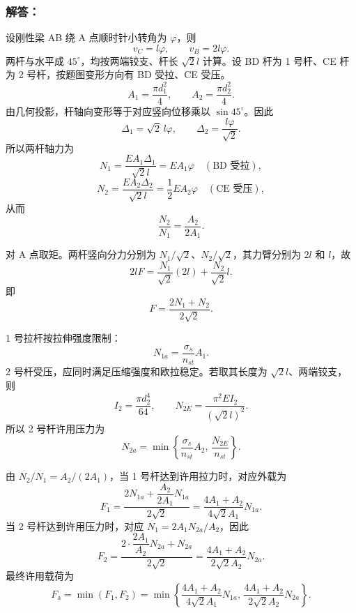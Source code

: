 \documentclass[11pt,a4paper]{ctexrep}
\begin{document}
{\subsubsection*{解答：}
设刚性梁 AB 绕 A 点顺时针小转角为 $\varphi$，则
\[
    v_C=l\varphi,\qquad v_B=2l\varphi.
\]
两杆与水平成 $45^\circ$，均按两端铰支、杆长 $\sqrt2l$ 计算。设 BD 杆为 1 号杆、CE 杆为 2 号杆，按题图变形方向有 BD 受拉、CE 受压。
\[
    A_1=\frac{\pi d_1^2}{4},\qquad A_2=\frac{\pi d_2^2}{4}.
\]
由几何投影，杆轴向变形等于对应竖向位移乘以 $\sin45^\circ$。因此
\[
    \Delta_1=\sqrt2\,l\varphi,\qquad
    \Delta_2=\frac{l\varphi}{\sqrt2}.
\]
所以两杆轴力为
\[
    N_1=\frac{EA_1\Delta_1}{\sqrt2l}=EA_1\varphi
    \quad(\text{BD 受拉}),
\]
\[
    N_2=\frac{EA_2\Delta_2}{\sqrt2l}=\frac12EA_2\varphi
    \quad(\text{CE 受压}),
\]
从而
\[
    \frac{N_2}{N_1}=\frac{A_2}{2A_1}.
\]

对 A 点取矩。两杆竖向分力分别为 $N_1/\sqrt2$、$N_2/\sqrt2$，其力臂分别为 $2l$ 和 $l$，故
\[
    2lF=\frac{N_1}{\sqrt2}(2l)+\frac{N_2}{\sqrt2}l.
\]
即
\[
    F=\frac{2N_1+N_2}{2\sqrt2}
    .
\]

1 号拉杆按拉伸强度限制：
\[
    N_{1a}=\frac{\sigma_s}{n_{st}}A_1.
\]
2 号杆受压，应同时满足压缩强度和欧拉稳定。若取其长度为 $\sqrt2l$、两端铰支，则
\[
    I_2=\frac{\pi d_2^4}{64},\qquad
    N_{2E}=\frac{\pi^2EI_2}{(\sqrt2l)^2}.
\]
所以 2 号杆许用压力为
\[
    N_{2a}
    =
    \min\left\{
    \frac{\sigma_s}{n_{st}}A_2,\,
    \frac{N_{2E}}{n_{st}}
    \right\}.
\]

由 $N_2/N_1=A_2/(2A_1)$，当 1 号杆达到许用拉力时，对应外载为
\[
    F_1=
    \frac{2N_{1a}+\dfrac{A_2}{2A_1}N_{1a}}{2\sqrt2}
    =
    \frac{4A_1+A_2}{4\sqrt2 A_1}N_{1a}.
\]
当 2 号杆达到许用压力时，对应 $N_1=2A_1N_{2a}/A_2$，因此
\[
    F_2=
    \frac{2\cdot\dfrac{2A_1}{A_2}N_{2a}+N_{2a}}{2\sqrt2}
    =
    \frac{4A_1+A_2}{2\sqrt2 A_2}N_{2a}.
\]
最终许用载荷为
\[
    F_{\mathrm{a}}=\min(F_1,F_2)
    =
    \min\left\{
    \frac{4A_1+A_2}{4\sqrt2 A_1}N_{1a},\,
    \frac{4A_1+A_2}{2\sqrt2 A_2}N_{2a}
    \right\}.
\]


}
\end{document}
